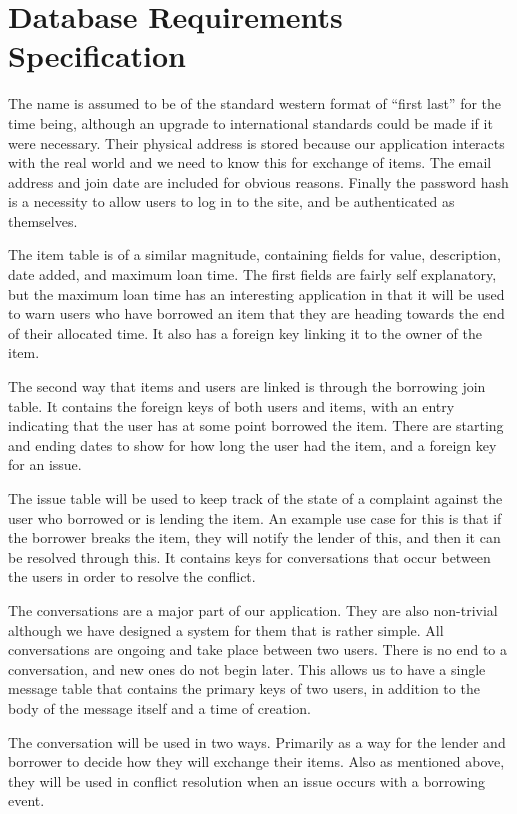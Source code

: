 \documentclass{acm_proc_article-sp}
\begin{document}
\section{Database Requirements Specification}
The name is assumed to be of the standard western format of ``first last'' for the time being, although an upgrade to international standards could be made if it were necessary. Their physical address is stored because our application interacts with the real world and we need to know this for exchange of items. The email address and join date are included for obvious reasons. Finally the password hash is a necessity to allow users to log in to the site, and be authenticated as themselves.

The item table is of a similar magnitude, containing fields for value, description, date added, and maximum loan time. The first fields are fairly self explanatory, but the maximum loan time has an interesting application in that it will be used to warn users who have borrowed an item that they are heading towards the end of their allocated time. It also has a foreign key linking it to the owner of the item.

The second way that items and users are linked is through the borrowing join table. It contains the foreign keys of both users and items, with an entry indicating that the user has at some point borrowed the item. There are starting and ending dates to show for how long the user had the item, and a foreign key for an issue.

The issue table will be used to keep track of the state of a complaint against the user who borrowed or is lending the item. An example use case for this is that if the borrower breaks the item, they will notify the lender of this, and then it can be resolved through this. It contains keys for conversations that occur between the users in order to resolve the conflict.

The conversations are a major part of our application. They are also non-trivial although we have designed a system for them that is rather simple. All conversations are ongoing and take place between two users. There is no end to a conversation, and new ones do not begin later. This allows us to have a single message table that contains the primary keys of two users, in addition to the body of the message itself and a time of creation.

The conversation will be used in two ways. Primarily as a way for the lender and borrower to decide how they will exchange their items. Also as mentioned above, they will be used in conflict resolution when an issue occurs with a borrowing event.
\end{document}
